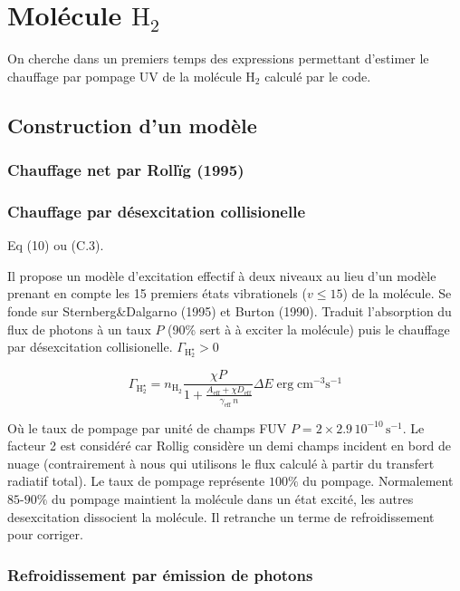\newpage
\section{Molécule $\mathrm{H}_2$}


On cherche dans un premiers temps des expressions permettant d'estimer le chauffage par pompage UV de la molécule $\mathrm{H}_2$ calculé par le code. 

\subsection{Construction d'un modèle}
\subsubsection{Chauffage net par Rollïg (1995)}

\subsubsection{Chauffage par désexcitation collisionelle}
Eq (10) ou (C.3).

Il propose un modèle d'excitation effectif à deux niveaux au lieu d'un modèle prenant en compte les 15 premiers états vibrationels ($v\leq 15$) de la molécule. Se fonde sur Sternberg&Dalgarno (1995) et Burton (1990). Traduit l'absorption du flux de photons à un taux $P$ (90\% sert à à exciter la molécule) puis le chauffage par désexcitation collisionelle. 
$\Gamma_{\mathrm{H}_2^\star} > 0$
 
\begin{equation}
\Gamma_{\mathrm{H}_2^\star} = n_{\mathrm{H}_2}\frac{\chi P}{1 + \frac{A_{\text{eff}}+ \chi D_{\text{eff}}}{\gamma_{\text{eff}}\, n}} \Delta E \operatorname{erg} \mathrm{cm}^{-3} \mathrm{s}^{-1}
\end{equation}

Où le taux de pompage par unité de champs FUV $P = 2 \times 2.9\,10^{-10}\,\mathrm{s}^{-1}$. Le facteur 2 est considéré car Rollig considère un demi champs incident en bord de nuage (contrairement à nous qui utilisons le flux calculé à partir du transfert radiatif total). Le taux de pompage représente $100\%$ du pompage. Normalement $85$-$90\%$ du pompage maintient la molécule dans un état excité, les autres desexcitation dissocient la molécule. Il retranche un terme de refroidissement pour corriger.

\subsubsection{Refroidissement par émission de photons}

